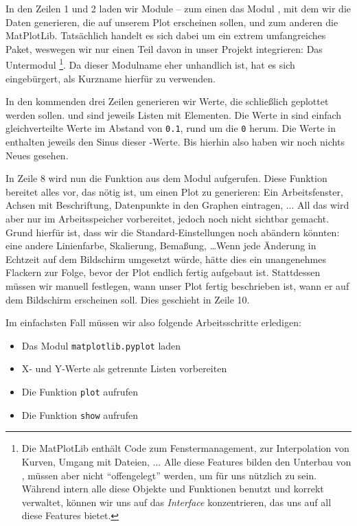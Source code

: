 In den Zeilen 1 und 2 laden wir Module -- zum einen das Modul , mit dem wir die Daten generieren, die auf unserem Plot erscheinen sollen, und zum anderen die MatPlotLib. Tatsächlich handelt es sich dabei um ein extrem umfangreiches Paket, weswegen wir nur einen Teil davon in unser Projekt integrieren: Das Untermodul \footnote{Die MatPlotLib enthält Code zum Fenstermanagement, zur Interpolation von Kurven, Umgang mit Dateien, ... Alle diese Features bilden den Unterbau von , müssen aber nicht \enquote{offengelegt} werden, um für uns nützlich zu sein. Während  intern alle diese Objekte und Funktionen benutzt und korrekt verwaltet, können wir uns auf das \emph{Interface} konzentrieren, das uns  auf all diese Features bietet.}. Da dieser Modulname  eher unhandlich ist, hat es sich eingebürgert,  als Kurzname hierfür zu verwenden.

In den kommenden drei Zeilen generieren wir Werte, die schließlich geplottet werden sollen.  und  sind jeweils Listen mit  Elementen. Die Werte in  sind einfach gleichverteilte Werte im Abstand von \texttt{0.1}, rund um die \texttt{0} herum. Die Werte in  enthalten jeweils den Sinus dieser -Werte. Bis hierhin also haben wir noch nichts Neues gesehen.

In Zeile 8 wird nun die Funktion  aus dem Modul  aufgerufen. Diese Funktion bereitet alles vor, das nötig ist, um einen Plot zu generieren: Ein Arbeitsfenster, Achsen mit Beschriftung, Datenpunkte in den Graphen eintragen, ... All das wird aber nur im Arbeitsspeicher vorbereitet, jedoch noch nicht sichtbar gemacht. Grund hierfür ist, dass wir die Standard-Einstellungen noch abändern könnten: eine andere Linienfarbe, Skalierung, Bemaßung, \ldots Wenn jede Änderung in Echtzeit auf dem Bildschirm umgesetzt würde, hätte dies ein unangenehmes Flackern zur Folge, bevor der Plot endlich fertig aufgebaut ist. Stattdessen müssen wir manuell festlegen, wann unser Plot fertig beschrieben ist, \ie wann er auf dem Bildschirm erscheinen soll. Dies geschieht in Zeile 10.

Im einfachsten Fall müssen wir also folgende Arbeitsschritte erledigen:
\begin{itemize}
\item Das Modul \texttt{matplotlib.pyplot} laden
\item X- und Y-Werte als getrennte Listen vorbereiten
\item Die Funktion \texttt{plot} aufrufen
\item Die Funktion \texttt{show} aufrufen
\end{itemize}


